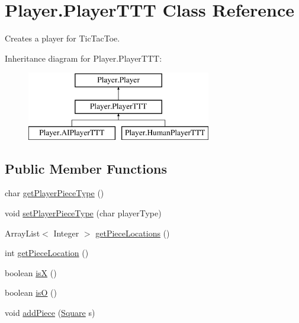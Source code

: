 \hypertarget{class_player_1_1_player_t_t_t}{}\section{Player.\+Player\+T\+T\+T Class Reference}
\label{class_player_1_1_player_t_t_t}


Creates a player for Tic\+Tac\+Toe.  


Inheritance diagram for Player.\+Player\+T\+T\+T\+:\begin{figure}[H]
\begin{center}
\leavevmode
\includegraphics[height=3.000000cm]{class_player_1_1_player_t_t_t}
\end{center}
\end{figure}
\subsection*{Public Member Functions}
\begin{DoxyCompactItemize}
\item 
char \hyperlink{class_player_1_1_player_t_t_t_ab8b6942da0005040404d3ac02c71e463}{get\+Player\+Piece\+Type} ()
\item 
void \hyperlink{class_player_1_1_player_t_t_t_ae624b6b5a46f011a667e0562ad150091}{set\+Player\+Piece\+Type} (char player\+Type)
\item 
Array\+List$<$ Integer $>$ \hyperlink{class_player_1_1_player_t_t_t_a491c3a16684131362d6808e4827d566e}{get\+Piece\+Locations} ()
\item 
int \hyperlink{class_player_1_1_player_t_t_t_aee939d68fa0f319d0e6101a9373e7c7e}{get\+Piece\+Location} ()
\item 
boolean \hyperlink{class_player_1_1_player_t_t_t_ace718e5b67209360615144048fd1814a}{is\+X} ()
\item 
boolean \hyperlink{class_player_1_1_player_t_t_t_ac3f8f41bc0b24865c80283d5a84be6d4}{is\+O} ()
\item 
void \hyperlink{class_player_1_1_player_t_t_t_ab3d884c71bcd92b42bea5a413caa95e8}{add\+Piece} (\hyperlink{class_square_1_1_square}{Square} s)
\end{DoxyCompactItemize}
